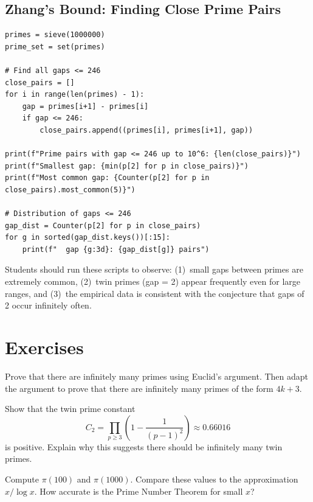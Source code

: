 \subsection{Zhang's Bound: Finding Close Prime Pairs}

\begin{verbatim}
primes = sieve(1000000)
prime_set = set(primes)

# Find all gaps <= 246
close_pairs = []
for i in range(len(primes) - 1):
    gap = primes[i+1] - primes[i]
    if gap <= 246:
        close_pairs.append((primes[i], primes[i+1], gap))

print(f"Prime pairs with gap <= 246 up to 10^6: {len(close_pairs)}")
print(f"Smallest gap: {min(p[2] for p in close_pairs)}")
print(f"Most common gap: {Counter(p[2] for p in close_pairs).most_common(5)}")

# Distribution of gaps <= 246
gap_dist = Counter(p[2] for p in close_pairs)
for g in sorted(gap_dist.keys())[:15]:
    print(f"  gap {g:3d}: {gap_dist[g]} pairs")
\end{verbatim}

\begin{highlightbox}
Students should run these scripts to observe: (1)~small gaps between primes are extremely common, (2)~twin primes (gap = 2) appear frequently even for large ranges, and (3)~the empirical data is consistent with the conjecture that gaps of 2 occur infinitely often.
\end{highlightbox}

\section{Exercises}

\begin{exercise}[Basic]
Prove that there are infinitely many primes using Euclid's argument. Then adapt the argument to prove that there are infinitely many primes of the form $4k + 3$.
\end{exercise}

\begin{exercise}[Intermediate]
Show that the twin prime constant
\[
C_2 = \prod_{p \geq 3} \left(1 - \frac{1}{(p-1)^2}\right) \approx 0.66016
\]
is positive. Explain why this suggests there should be infinitely many twin primes.
\end{exercise}

\begin{exercise}[Challenge]
Compute $\pi(100)$ and $\pi(1000)$. Compare these values to the approximation $x/\log x$. How accurate is the Prime Number Theorem for small $x$?
\end{exercise}

